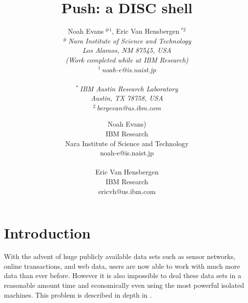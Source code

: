 \documentclass[10pt,conference,letterpaper]{IEEEtran}
\title{Push: a DISC shell}
\author{%
{Noah Evans{\small $~^{\#1}$}, Eric Van Hensbergen{\small $~^{*2}$} }%
\vspace{1.6mm}\\
\fontsize{10}{10}\selectfont\itshape
$^{\#}$\,Nara Institute of Science and Technology\\
Los Alamos, NM 87545, USA\\
(Work completed while at IBM Research)\\
\fontsize{9}{9}\selectfont\ttfamily\upshape
$^{1}$\,noah-e@is.naist.jp\\
\vspace{1.2mm}\\
\fontsize{10}{10}\selectfont\rmfamily\itshape
$^{*}$\,IBM Austin Research Laboratory\\
Austin, TX 78758, USA\\
\fontsize{9}{9}\selectfont\ttfamily\upshape
$^{2}$\,bergevan@us.ibm.com
}
\author{Noah Evans)\\
IBM Research\\
Nara Institute of Science and Technology\\
noah-e@is.naist.jp\\\\
Eric Van Hensbergen\\
IBM Research\\
ericvh@us.ibm.com\\
}
\begin{document}
\maketitle

%
%
%

\renewcommand{\topfraction}{0.85}
\renewcommand{\textfraction}{0.1}



\section{Introduction}

With the advent of huge publicly available data sets such as sensor networks, online transactions, and web data, users are now able to work with much more data than ever before. However it is also impossible to deal these data sets in a reasonable amount time and economically even using the most powerful isolated machines. This problem is described in depth in \cite{barroso2003wsp}.
\end{document}
